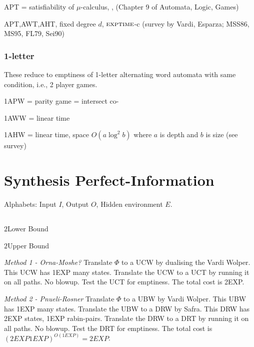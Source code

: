 \documentclass[a4paper,10pt]{article}
\begin{document}
APT = satisfiability of $\mu$-calculus, \exptime, (Chapter 9 of Automata, Logic, Games)

APT,AWT,AHT, fixed degree $d$, $\textsc{exptime}$-c (survey by Vardi, Esparza; MSS86, MS95, FL79, Sei90)

\subsubsection{1-letter}

These reduce to emptiness of 1-letter alternating word automata with same condition, i.e., 2 player games. 

1APW = parity game = \np intersect co-\np

1AWW = linear time

1AHW = linear time, space $O(a \log^2b)$ where $a$ is depth and $b$ is size (see survey)


\section{Synthesis Perfect-Information}

Alphabets: Input $I$, Output $O$, Hidden environment $E$.

\subsection{\LTL}

$2$\exptime Lower Bound \cite{Rosner92}

$2$\exptime Upper Bound \cite{PnueliRosner89}



\emph{Method 1 - Orna-Moshe?}
\en
\- Translate $\Phi$ to a UCW by dualising the Vardi Wolper. This UCW has 1EXP many states.
\- Translate the UCW to a UCT by running it on all paths. No blowup.
\- Test the UCT for emptiness. The total cost is 2EXP.
\ne

\emph{Method 2 - Pnueli-Rosner}
\en
\- Translate $\Phi$ to a UBW by Vardi Wolper. This UBW has 1EXP many states.
\- Translate the UBW to a DRW by Safra. This DRW has 2EXP states, 1EXP rabin-pairs.
\- Translate the DRW to a DRT by running it on all paths. No blowup.
\- Test the DRT for emptiness. The total cost is $(2EXP 1EXP)^{O(1EXP)} = 2EXP$.
\ne



\subsection{\CTLS}
\end{document}
